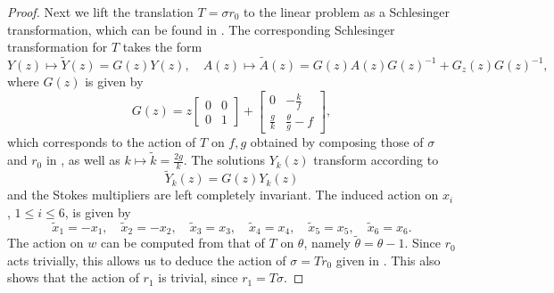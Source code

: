 \documentclass[a4paper,reqno]{amsart}
\numberwithin{equation}{section}
\numberwithin{equation}{section}
\begin{document}
\begin{proof}
    Next we lift the translation $T = \sigma r_0$ to the linear problem as a Schlesinger transformation, which can be found in \cite[Sec. 6.1]{fokas}.
    The corresponding Schlesinger transformation for $T$ takes the form
\begin{equation*}
    Y(z)\mapsto \widetilde{Y}(z)=G(z)Y(z),\quad A(z)\mapsto \widetilde{A}(z)=G(z)A(z)G(z)^{-1}+G_z(z)G(z)^{-1},
\end{equation*}
where $G(z)$ is given by 
\begin{equation*}
    G(z)=z\begin{bmatrix}
        0 & 0\\
        0 & 1
    \end{bmatrix}+\begin{bmatrix}
        0 & -\frac{k}{f} \\
 \frac{g}{k} & \frac{\theta }{g}-f
    \end{bmatrix},
\end{equation*}
which corresponds to the action of $T$ on $f,g$ obtained by composing those of $\sigma$ and $r_0$ in , as well as $k\mapsto\tilde{k}=\frac{2g}{k}$.
The solutions $Y_k(z)$ transform according to 
$$ \widetilde{Y}_k(z)=G(z) Y_k(z)$$ 
and the Stokes multipliers are left completely invariant.
The induced action on $x_i$, $1\leq i\leq 6$, is given by 
$$\tilde{x}_1 = - x_1, \quad \tilde{x}_2=-x_2, \quad \tilde{x}_3 = x_3, \quad \tilde{x}_4=x_4, \quad \tilde{x}_5=x_5, \quad \tilde{x}_6=x_6.$$
The action on $w$ can be computed from that of $T$ on $\theta$, namely $\tilde{\theta}=\theta-1$.
Since $r_0$ acts trivially, this allows us to deduce the action of $\sigma = T r_0$ given  in .
This also shows that the action of $r_1$ is trivial, since $r_1 =T \sigma$.


\end{proof}
\end{document}
